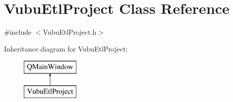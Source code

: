 \hypertarget{class_vubu_etl_project}{}\section{Vubu\+Etl\+Project Class Reference}
\label{class_vubu_etl_project}


{\ttfamily \#include $<$Vubu\+Etl\+Project.\+h$>$}

Inheritance diagram for Vubu\+Etl\+Project\+:\begin{figure}[H]
\begin{center}
\leavevmode
\includegraphics[height=2.000000cm]{class_vubu_etl_project}
\end{center}
\end{figure}
